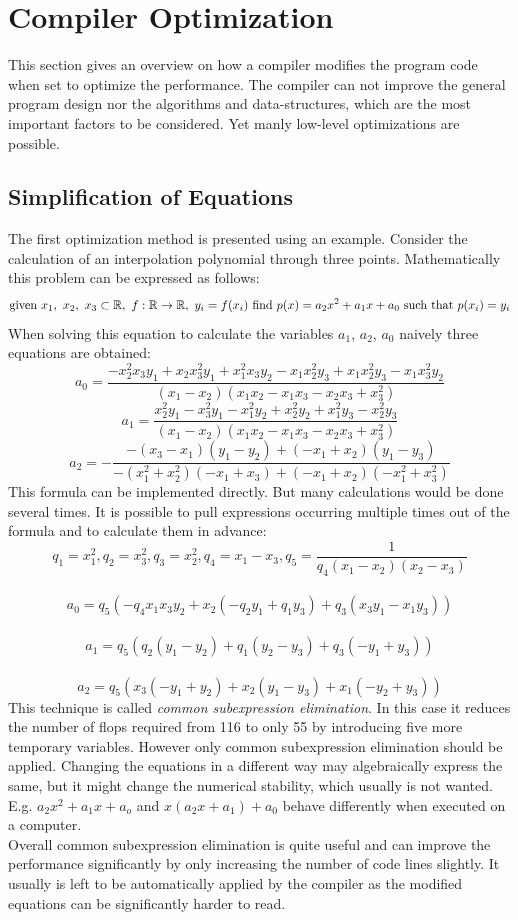 \documentclass[12pt, a4paper]{article}
\begin{document}
\section{Compiler Optimization}
This section gives an overview on how a compiler modifies the program code when set to optimize the performance. The compiler can not improve the general program design nor the algorithms and data-structures, which are the most important factors to be considered. Yet manly low-level optimizations are possible.
\subsection{Simplification of Equations}
The first optimization method is presented using an example. Consider the calculation of an interpolation polynomial through three points. Mathematically this problem can be expressed as follows:
$$ \text{given } x_1,\ x_2,\ x_3 \subset \mathbb{R},\ f:\mathbb{R}\rightarrow\mathbb{R},\ y_i = f(x_i) \\
    \text{ find }p(x) = a_2x^2 + a_1 x + a_0 \text{ such that }p(x_i) = y_i$$
When solving this equation to calculate the variables $a_1$, $a_2$, $a_0$ naively three equations are obtained:
    $$a_0 = \frac{-x_2^2x_3y_1+x_2x_3^2y_1+x_1^2x_3y_2-x_1x_2^2y_3+x_1x_2^2y_3-x_1x_3^2y_2}{(x_1-x_2)(x_1x_2-x_1x_3-x_2x_3+x_3^2)}$$
     $$a_1 = \frac{x_2^2y_1-x_3^2y_1-x_1^2y_2+x_2^2y_2+x_1^2y_3-x_2^2y_3}{(x_1-x_2)(x_1x_2-x_1x_3-x_2x_3+x_3^2)}$$ $$
   a_2 = - \frac{-(x_3-x_1)(y_1-y_2)+(-x_1+x_2)(y_1-y_3)}{-(x_1^2+x_2^2)(-x_1+x_3)+(-x_1+x_2)(-x_1^2+x_3^2)}$$
   This formula can be implemented directly. But many calculations would be done several times. It is possible to pull expressions occurring multiple times out of the formula and to calculate them in advance: 
   $$q_1 = x_1^2, q_2 = x_3^2, q_3 = x_2^2, q_4 = x_1-x_3, q_5 = \frac{1}{q_4(x_1-x_2)(x_2-x_3)}$$\\
    $$a_0 = q_5(-q_4x_1x_3y_2+x_2(-q_2y_1+q_1y_3)+q_3(x_3y_1-x_1y_3))$$ \\
    $$a_1 = q_5(q_2(y_1-y_2)+q_1(y_2-y_3)+q_3(-y_1+y_3))$$ \\
    $$a_2 = q_5(x_3(-y_1+y_2)+x_2(y_1-y_3)+x_1(-y_2+y_3))$$ 
    This technique is called \textit{common subexpression elimination}. In this case it reduces the number of flops required from 116 to only 55 by introducing five more temporary variables. However only common subexpression elimination should be applied. Changing the equations in a different way may algebraically express the same, but it might change the numerical stability, which usually is not wanted. E.g. $a_2x^2+a_1x+a_o$ and $x(a_2x+a_1)+a_0$ behave differently when executed on a computer. \\
Overall common subexpression elimination is quite useful and can improve the performance significantly by only increasing the number of code lines slightly. It usually is left to be automatically applied by the compiler as the modified equations can be significantly harder to read.
\end{document}
